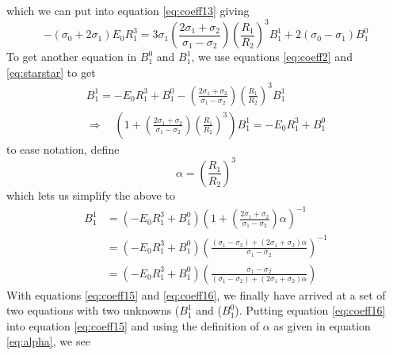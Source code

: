 which we can put into equation \ref{eq:coeff13} giving
\begin{equation}
    - (\sigma_0 + 2\sigma_1)E_0 R_1^{3}
    = 3\sigma_1 \left(\frac{2\sigma_1 + \sigma_2}{\sigma_1 - \sigma_2}\right) \left(\frac{R_1 }{R_2}\right)^3 B_1^1
    + 2 (\sigma_0-\sigma_1)B_1^0
    \label{eq:coeff15}
\end{equation}
To get another equation in $B_1^0$ and $B_1^1$, we use equations \ref{eq:coeff2} and \ref{eq:starstar} to get
\begin{displaymath}
    \begin{split}
        B_1^1 = -E_0R_1^3 + B_1^0 - \left(\frac{2\sigma_1 + \sigma_2}{\sigma_1 - \sigma_2}\right) \left(\frac{R_1}{R_2}\right)^3 B_1^1 \\
        \Rightarrow \quad
         \left(1+ \left(\frac{2\sigma_1 + \sigma_2}{\sigma_1 - \sigma_2}\right) \left(\frac{R_1}{R_2}\right)^3\right) B_1^1 = -E_0R_1^3 + B_1^0
    \end{split}
\end{displaymath}
to ease notation, define
\begin{equation}
    \alpha = \left(\frac{R_1}{R_2}\right)^3
    \label{eq:alpha}
\end{equation}
which lets us simplify the above to
\begin{equation}
    \begin{split}
         B_1^1 &= \left(-E_0 R_1^3 + B_1^0\right)\left(1+ \left(\frac{2\sigma_1 + \sigma_2}{\sigma_1 - \sigma_2}\right) \alpha \right)^{-1}
         \\
         &= \left(-E_0 R_1^3 + B_1^0\right)\left(\frac{\left(\sigma_1 - \sigma_2\right) + \left(2\sigma_1 + \sigma_2\right)\alpha}{\sigma_1 - \sigma_2}  \right)^{-1}
         \\
         &= \left(-E_0 R_1^3 + B_1^0\right)\left(\frac{\sigma_1 - \sigma_2} {\left(\sigma_1 - \sigma_2\right) + \left(2\sigma_1 + \sigma_2\right)\alpha} \right)
     \end{split}
     \label{eq:coeff16}
\end{equation}
With equations \ref{eq:coeff15} and \ref{eq:coeff16}, we finally have arrived at a set of two equations with two unknowns ($B_1^1$ and ($B_1^0$). Putting equation \ref{eq:coeff16} into equation \ref{eq:coeff15} and using the definition of $\alpha$ as given in equation \ref{eq:alpha}, we see
